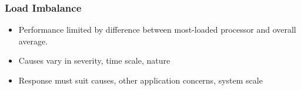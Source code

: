 


\begin{frame}
\frametitle{Load Imbalance}
\begin{itemize}
\item Performance limited by difference between most-loaded processor and overall average.\\
\pause
\item Causes vary in severity, time scale, nature
\pause
\item Response must suit causes, other application concerns, system scale
\end{itemize}
\end{frame}


